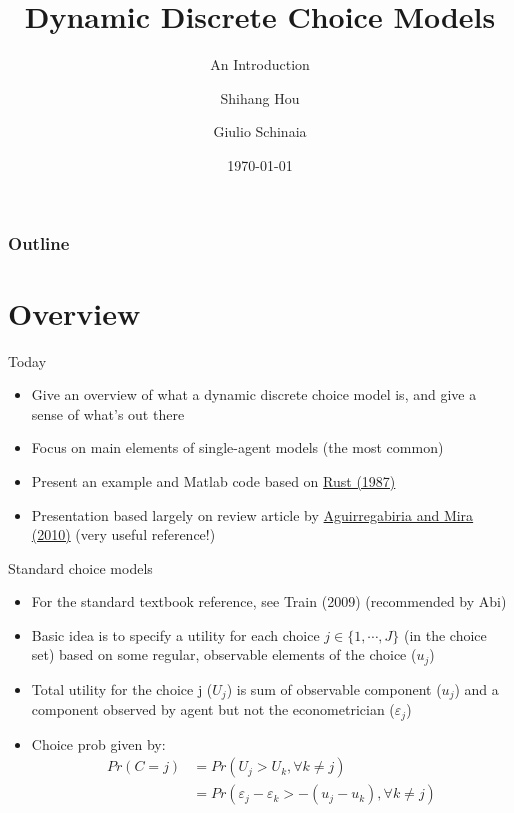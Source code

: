 \documentclass[aspectratio=169]{beamer}
\title{Dynamic Discrete Choice Models}
\subtitle{An Introduction}
\author{
	Shihang Hou
	\and 
	Giulio Schinaia
}
\institute{University of Oxford}
\date{\today}
\begin{document}
	\begin{frame}
		\titlepage
	\end{frame}
	
	\begin{frame}
		\frametitle{Outline}
		\tableofcontents
	\end{frame}
	
	\section{Overview}
	
	\begin{frame}{Today}
		\begin{itemize}
			\itemsep1em
			\item Give an overview of what a dynamic discrete choice model is, and give a sense of what's out there
			\item Focus on main elements of single-agent models (the most common)
			\pause
			\item Present an example and Matlab code based on \href{https://www.dropbox.com/s/5wn4yj16uhd8s4r/Rust_Optimal\%20Replacement\%20of\%20GMC\%20Bus\%20Engines\%20An\%20Empirical\%20Model\%20of\%20Harold\%20Zurcher_ECMA_1987.pdf?dl=0P}{Rust (1987)}
			\pause
			\item Presentation based largely on review article by \href{https://www.dropbox.com/s/zvsldc5pmoy1597/Aguirregabiria\%2C\%20Mira_2010_Dynamic\%20discrete\%20choice\%20structural\%20models\%20A\%20survey.pdf?dl=0}{Aguirregabiria and Mira (2010)} (very useful reference!)
		\end{itemize}
	\end{frame}
	
	\begin{frame}{Standard choice models}
		\begin{itemize}
			\itemsep1em
			\item For the standard textbook reference, see Train (2009) (recommended by Abi)
			\item Basic idea is to specify a utility for each choice $j \in \{1,\cdots,J\}$ (in the choice set) based on some regular, observable elements of the choice ($u_j$)
			\pause
			\item Total utility for the choice j ($U_j$) is sum of observable component ($u_j$) and a component observed by agent but not the econometrician ($\varepsilon_j$)
			\pause
			\item Choice prob given by:
			\begin{align*}
				Pr(C = j) &= Pr(U_j > U_k , \forall k \neq j) \\
				&= Pr(\varepsilon_j - \varepsilon_k > - (u_j - u_k), \forall k \neq j)
			\end{align*}
		\end{itemize}
		
	\end{frame}
	
\end{document}
